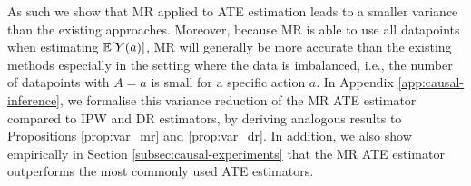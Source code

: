 As such we show that MR applied to ATE estimation leads to a smaller variance than the existing approaches. Moreover, because MR is able to use all datapoints when estimating $\mathbb{E}[Y(a)]$, MR will generally be more accurate than the existing methods especially in the setting where the data is imbalanced, i.e., the number of datapoints with $A=a$ is small for a specific action $a$.
In Appendix \ref{app:causal-inference}, we formalise this variance reduction of the MR ATE estimator compared to IPW and DR estimators, by deriving analogous results to Propositions \ref{prop:var_mr} and \ref{prop:var_dr}. In addition, we also show empirically in Section \ref{subsec:causal-experiments} that the MR ATE estimator outperforms the most commonly used ATE estimators.

